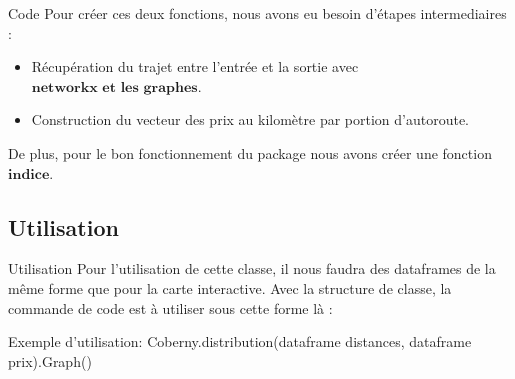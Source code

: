\documentclass{beamer}
\begin{document}
\begin{frame}[fragile]{Code}
Pour créer ces deux fonctions, nous avons eu besoin d'étapes intermediaires : 
\begin{itemize}
\item Récupération du trajet entre l'entrée et la sortie avec $\textbf{networkx et les graphes}$.
\item Construction du vecteur des prix au kilomètre par portion d'autoroute.
\end{itemize}
\pause
De plus, pour le bon fonctionnement du package nous avons créer une fonction  $\textbf{indice}$.

\end{frame}

\subsection{Utilisation}

\begin{frame}[fragile]{Utilisation}
Pour l'utilisation de cette classe, il nous faudra des dataframes de la même forme que pour la carte interactive. \newline
\pause
Avec la structure de classe, la commande de code est à utiliser sous cette forme là :
\pause
\begin{block}{Exemple d'utilisation:}
Coberny.distribution(dataframe distances, dataframe prix).Graph()
\end{block}

\end{frame}
\end{document}
